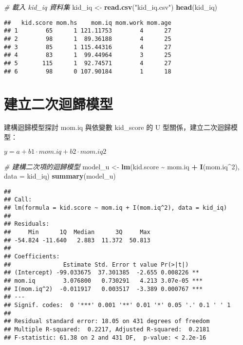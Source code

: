 \documentclass[
]{article}
\newenvironment{Shaded}{\begin{snugshade}}{\end{snugshade}}
\newcommand{\AttributeTok}[1]{\textcolor[rgb]{0.13,0.29,0.53}{#1}}
\newcommand{\CommentTok}[1]{\textcolor[rgb]{0.56,0.35,0.01}{\textit{#1}}}
\newcommand{\DecValTok}[1]{\textcolor[rgb]{0.00,0.00,0.81}{#1}}
\newcommand{\FunctionTok}[1]{\textcolor[rgb]{0.13,0.29,0.53}{\textbf{#1}}}
\newcommand{\NormalTok}[1]{#1}
\newcommand{\OtherTok}[1]{\textcolor[rgb]{0.56,0.35,0.01}{#1}}
\newcommand{\SpecialCharTok}[1]{\textcolor[rgb]{0.81,0.36,0.00}{\textbf{#1}}}
\newcommand{\StringTok}[1]{\textcolor[rgb]{0.31,0.60,0.02}{#1}}
\begin{document}
\begin{Shaded}
\begin{Highlighting}[]
\CommentTok{\# 載入 \textasciigrave{}kid\_iq\textasciigrave{} 資料集}
\NormalTok{kid\_iq }\OtherTok{\textless{}{-}} \FunctionTok{read.csv}\NormalTok{(}\StringTok{"kid\_iq.csv"}\NormalTok{)}
\FunctionTok{head}\NormalTok{(kid\_iq)}
\end{Highlighting}
\end{Shaded}

\begin{verbatim}
##   kid.score mom.hs    mom.iq mom.work mom.age
## 1        65      1 121.11753        4      27
## 2        98      1  89.36188        4      25
## 3        85      1 115.44316        4      27
## 4        83      1  99.44964        3      25
## 5       115      1  92.74571        4      27
## 6        98      0 107.90184        1      18
\end{verbatim}

\section{建立二次迴歸模型}\label{ux5efaux7acbux4e8cux6b21ux8ff4ux6b78ux6a21ux578b}

建構迴歸模型探討 mom.iq 與依變數 kid\_score 的 U
型關係，建立二次迴歸模型：

\(y=a+b1​⋅mom.iq+b2​⋅mom.iq2\)

\begin{Shaded}
\begin{Highlighting}[]
\CommentTok{\# 建構二次項的迴歸模型}
\NormalTok{model\_u }\OtherTok{\textless{}{-}} \FunctionTok{lm}\NormalTok{(kid.score }\SpecialCharTok{\textasciitilde{}}\NormalTok{ mom.iq }\SpecialCharTok{+} \FunctionTok{I}\NormalTok{(mom.iq}\SpecialCharTok{\^{}}\DecValTok{2}\NormalTok{), }\AttributeTok{data =}\NormalTok{ kid\_iq)}
\FunctionTok{summary}\NormalTok{(model\_u)}
\end{Highlighting}
\end{Shaded}

\begin{verbatim}
## 
## Call:
## lm(formula = kid.score ~ mom.iq + I(mom.iq^2), data = kid_iq)
## 
## Residuals:
##     Min      1Q  Median      3Q     Max 
## -54.824 -11.640   2.883  11.372  50.813 
## 
## Coefficients:
##               Estimate Std. Error t value Pr(>|t|)    
## (Intercept) -99.033675  37.301385  -2.655 0.008226 ** 
## mom.iq        3.076800   0.730291   4.213 3.07e-05 ***
## I(mom.iq^2)  -0.011917   0.003517  -3.389 0.000767 ***
## ---
## Signif. codes:  0 '***' 0.001 '**' 0.01 '*' 0.05 '.' 0.1 ' ' 1
## 
## Residual standard error: 18.05 on 431 degrees of freedom
## Multiple R-squared:  0.2217, Adjusted R-squared:  0.2181 
## F-statistic: 61.38 on 2 and 431 DF,  p-value: < 2.2e-16
\end{verbatim}
\end{document}
